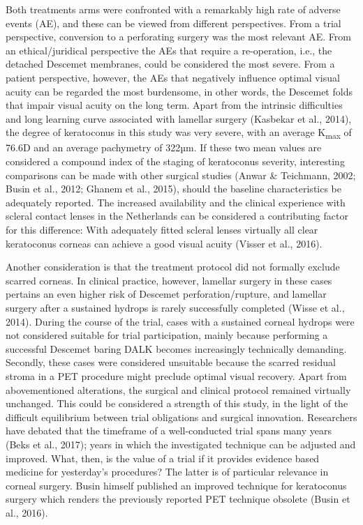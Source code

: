 \documentclass[authordate, empirical]{jote-new-article}
\begin{document}
	Both treatments arms were confronted with a remarkably high rate of adverse events (AE), and these can be viewed from different perspectives. From a trial perspective, conversion to a perforating surgery was the most relevant AE. From an ethical/juridical perspective the AEs that require a re-operation, i.e., the detached Descemet membranes, could be considered the most severe. From a patient perspective, however, the AEs that negatively influence optimal visual acuity can be regarded the most burdensome, in other words, the Descemet folds that impair visual acuity on the long term. Apart from the intrinsic difficulties and long learning curve associated with lamellar surgery\textsuperscript{ }(Kasbekar et al., 2014), the degree of keratoconus in this study was very severe, with an average K\textsubscript{max} of 76.6D and an average pachymetry of 322µm. If these two mean values are considered a compound index of the staging of keratoconus severity, interesting comparisons can be made with other surgical studies (Anwar \& Teichmann, 2002; Busin et al., 2012; Ghanem et al., 2015), should the baseline characteristics be adequately reported. The increased availability and the clinical experience with scleral contact lenses in the Netherlands can be considered a contributing factor for this difference: With adequately fitted scleral lenses virtually all clear keratoconus corneas can achieve a good visual acuity (Visser et al., 2016).



	Another consideration is that the treatment protocol did not formally exclude scarred corneas. In clinical practice, however, lamellar surgery in these cases pertains an even higher risk of Descemet perforation/rupture, and lamellar surgery after a sustained hydrops is rarely successfully completed (Wisse et al., 2014). During the course of the trial, cases with a sustained corneal hydrops were not considered suitable for trial participation, mainly because performing a successful Descemet baring DALK becomes increasingly technically demanding. Secondly, these cases were considered unsuitable because the scarred residual stroma in a PET procedure might preclude optimal visual recovery. Apart from abovementioned alterations, the surgical and clinical protocol remained virtually unchanged. This could be considered a strength of this study, in the light of the difficult equilibrium between trial obligations and surgical innovation. Researchers have debated that the timeframe of a well-conducted trial spans many years (Beks et al., 2017); years in which the investigated technique can be adjusted and improved. What, then, is the value of a trial if it provides evidence based medicine for yesterday's procedures? The latter is of particular relevance in corneal surgery. Busin himself published an improved technique for keratoconus surgery which renders the previously reported PET technique obsolete (Busin et al., 2016).
\end{document}
